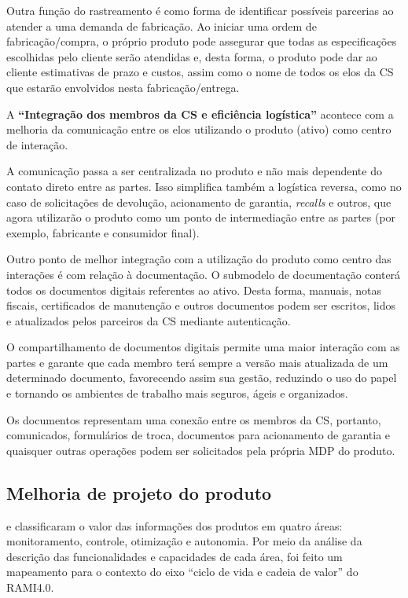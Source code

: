 Outra função do rastreamento é como forma de identificar possíveis parcerias ao atender a uma demanda de fabricação. Ao iniciar uma ordem de fabricação/compra, o próprio produto pode assegurar que todas as especificações escolhidas pelo cliente serão atendidas e, desta forma, o produto pode dar ao cliente estimativas de prazo e custos, assim como o nome de todos os elos da CS que estarão envolvidos nesta fabricação/entrega.

A \textbf{``Integração dos membros da CS e eficiência logística''} acontece com a melhoria da comunicação entre os elos utilizando o produto (ativo) como centro de interação.

A comunicação passa a ser centralizada no produto e não mais dependente do contato direto entre as partes. Isso simplifica também a logística reversa, como no caso de solicitações de devolução, acionamento de garantia, \textit{recalls} e outros, que agora utilizarão o produto como um ponto de intermediação entre as partes (por exemplo, fabricante e consumidor final).

Outro ponto de melhor integração com a utilização do produto como centro das interações é com relação à documentação. O submodelo de documentação conterá todos os documentos digitais referentes ao ativo. Desta forma, manuais, notas fiscais, certificados de manutenção e outros documentos podem ser escritos, lidos e atualizados pelos parceiros da CS mediante autenticação.

O compartilhamento de documentos digitais permite uma maior interação com as partes e garante que cada membro terá sempre a versão mais atualizada de um determinado documento, favorecendo assim sua gestão, reduzindo o uso do papel e tornando os ambientes de trabalho mais seguros, ágeis e organizados.

Os documentos representam uma conexão entre os membros da CS, portanto, comunicados, formulários de troca, documentos para acionamento de garantia e quaisquer outras operações podem ser solicitados pela própria MDP do produto.

\subsection{Melhoria de projeto do produto}
\label{sub:melhoria-projeto}

 e  classificaram o valor das informações dos produtos em quatro áreas: monitoramento, controle, otimização e autonomia. Por meio da análise da descrição das funcionalidades e capacidades de cada área, foi feito um mapeamento para o contexto do eixo ``ciclo de vida e cadeia de valor'' do RAMI4.0.


